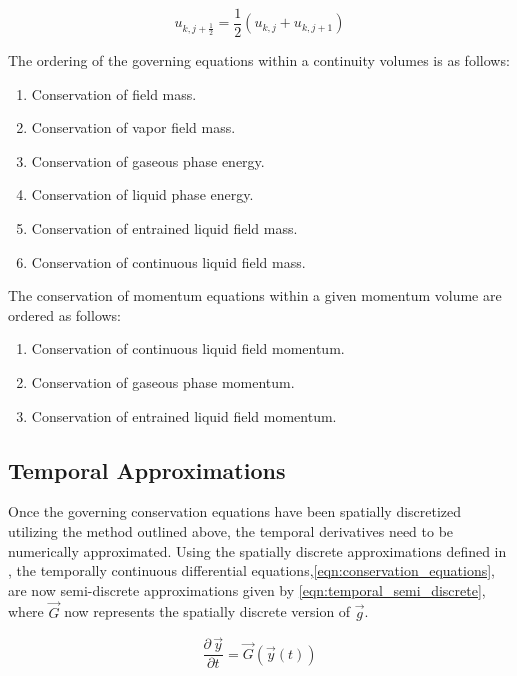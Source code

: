 \begin{equation}
\label{eqn:average_advecting_vel}
u_{k,j+\frac{1}{2}} = \frac{1}{2}\left(u_{k,j} + u_{k, j+1}\right)
\end{equation}

The ordering of the governing equations within a continuity volumes is as follows:

\begin{enumerate}
\item{Conservation of \ncg field mass.}
\item{Conservation of vapor field mass.}
\item{Conservation of gaseous phase energy.}
\item{Conservation of liquid phase energy.}
\item{Conservation of entrained liquid field mass.}
\item{Conservation of continuous liquid field mass.}
\end{enumerate}

The conservation of momentum equations within a given momentum volume are ordered as follows:

\begin{enumerate}
\item{Conservation of continuous liquid field momentum.}
\item{Conservation of gaseous phase momentum.}
\item{Conservation of entrained liquid field momentum.}
\end{enumerate}

\subsection{Temporal Approximations}
\label{subsect:temporal_approx}
Once the governing conservation equations have been spatially discretized utilizing the method outlined above, the temporal derivatives need to be numerically approximated.
Using the spatially discrete approximations defined in , the temporally continuous differential equations,\eqref{eqn:conservation_equations}, are now semi-discrete approximations given by \eqref{eqn:temporal_semi_discrete}, where $\vec{G}$ now represents the spatially discrete version of $\vec{g}$.

\begin{equation}
\label{eqn:temporal_semi_discrete}
\frac{\partial \,\vec{y} }{\partial t} = \vec{G}(\vec{y}(t))
\end{equation}

